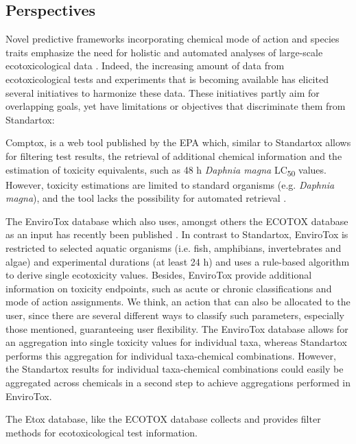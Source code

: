 \subsection{Perspectives}
Novel predictive frameworks incorporating chemical mode of action and species traits emphasize the need for holistic and automated analyses of large-scale ecotoxicological data \citep{malaj_evolutionary_2016, vandenberg_modeling_2019}. Indeed, the increasing amount of data from ecotoxicological tests and experiments that is becoming available has elicited several initiatives to harmonize these data. These initiatives partly aim for overlapping goals, yet have limitations or objectives that discriminate them from Standartox:

Comptox, is a web tool published by the EPA which, similar to Standartox allows for filtering test results, the retrieval of additional chemical information and the estimation of toxicity equivalents, such as 48 h \textit{Daphnia magna} LC\textsubscript{50} values. However, toxicity estimations are limited to standard organisms (e.g. \textit{Daphnia magna}), and the tool lacks the possibility for automated retrieval \citep{williams_comptox_2017}.

The EnviroTox database which also uses, amongst others the ECOTOX database as an input has recently been published \citep{healthandenvironmentalsciencesinstitutehesi_envirotox_2019, connors_creation_2019}. In contrast to Standartox, EnviroTox  is restricted to selected aquatic organisms (i.e. fish, amphibians, invertebrates and algae) and experimental durations (at least 24 h) and uses a rule-based algorithm to derive single ecotoxicity values. Besides, EnviroTox provide additional information on toxicity endpoints, such as acute or chronic classifications and mode of action assignments. We think, an action that can also be allocated to the user, since there are several different ways to classify such parameters, especially those mentioned, guaranteeing user flexibility. The EnviroTox database allows for an aggregation into single toxicity values for individual taxa, whereas Standartox performs this aggregation for individual taxa-chemical combinations. However, the Standartox results for individual taxa-chemical combinations could easily be aggregated across chemicals in a second step to achieve aggregations performed in EnviroTox.

The Etox database, like the ECOTOX database collects and provides filter methods for ecotoxicological test information.

